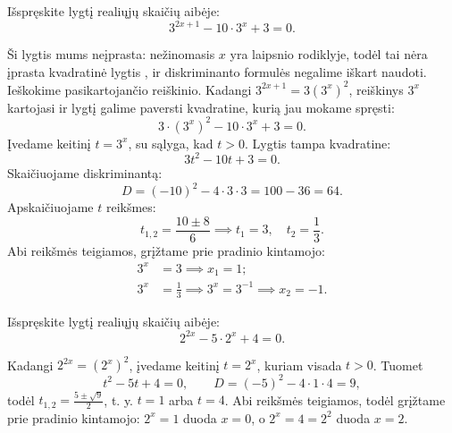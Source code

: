\documentclass[11pt,a4paper]{scrartcl}
\begin{document}
\begin{example}
Išspręskite lygtį realiųjų skaičių aibėje:
\begin{equation*}
3^{2x+1}-10 \cdot 3^x+3=0.
\end{equation*}
\end{example}
\begin{solution}
Ši lygtis mums neįprasta: nežinomasis \(x\) yra laipsnio rodiklyje, todėl tai nėra įprasta kvadratinė lygtis , ir diskriminanto formulės negalime iškart naudoti. Ieškokime pasikartojančio reiškinio. Kadangi \(3^{2x+1}=3(3^x)^2\), reiškinys \(3^x\) kartojasi ir lygtį galime paversti kvadratine, kurią jau mokame spręsti:
\begin{equation*}
3 \cdot (3^x)^2-10 \cdot 3^x+3=0.
\end{equation*}
Įvedame keitinį \(t=3^x\), su sąlyga, kad \(t>0\). Lygtis tampa kvadratine:
\begin{equation*}
3t^2-10t+3=0.
\end{equation*}
Skaičiuojame diskriminantą:
\begin{equation*}
D=(-10)^2-4 \cdot 3 \cdot 3=100-36=64.
\end{equation*}
Apskaičiuojame \(t\) reikšmes:
\begin{equation*}
t_{1,2}=\frac{10 \pm 8}{6} \implies t_1=3, \quad t_2=\frac{1}{3}.
\end{equation*}
Abi reikšmės teigiamos, grįžtame prie pradinio kintamojo:
\begin{equation*}
\begin{aligned}
3^x&=3 \implies x_1=1;\\
3^x&=\frac{1}{3} \implies 3^x=3^{-1} \implies x_2=-1.
\end{aligned}
\end{equation*}
\end{solution}

\begin{example}
Išspręskite lygtį realiųjų skaičių aibėje:
\begin{equation*}
2^{2x}-5\cdot2^x+4=0.
\end{equation*}
\end{example}
\begin{solution}
Kadangi \(2^{2x}=(2^x)^2\), įvedame keitinį \(t=2^x\), kuriam visada \(t>0\). Tuomet
\begin{equation*}
t^2-5t+4=0,\qquad D=(-5)^2-4\cdot1\cdot4=9,
\end{equation*}
todėl \(t_{1,2}=\frac{5\pm\sqrt9}{2}\), t. y. \(t=1\) arba \(t=4\). Abi reikšmės teigiamos, todėl grįžtame prie pradinio kintamojo: \(2^x=1\) duoda \(x=0\), o \(2^x=4=2^2\) duoda \(x=2\).
\end{solution}
\end{document}
